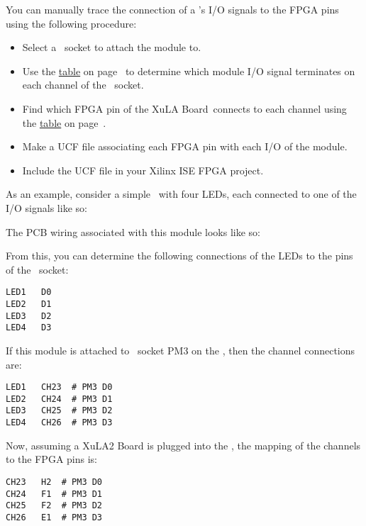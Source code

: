 \documentclass[letterpaper,11pt,oneside]{memoir}
\newcommand{\xula}{XuLA Board}
\renewcommand{\fixedpic}[1]{}
\begin{document}
You can manually trace the connection of a \digpmod's I/O signals to the
FPGA pins using the following procedure:

\begin{itemize}
\item Select a \digpmod\ socket to attach the module to.
\item Use the \hyperref[tab:ChanneltoPMODConnections]{table} on page~\pageref{tab:ChanneltoPMODConnections} to determine 
	which module I/O signal terminates on each channel of the \digpmod\ socket.
\item Find which FPGA pin of the \xula\ connects to each channel using the
	\hyperref[tab:ChanneltoFPGAConnections]{table} on page~\pageref{tab:ChanneltoFPGAConnections}.
\item Make a UCF file associating each FPGA pin with each I/O of the module.
\item Include the UCF file in your Xilinx ISE FPGA project.
\end{itemize}

\pagebreak %

As an example, consider a simple \digpmod\ with four LEDs, each
connected to one of the I/O signals like so:

\fixedpic{\texttt{[image: pmod\_example\_schematic.png]}}

The PCB wiring associated with this module looks like so:

\fixedpic{\texttt{[image: pmod\_example\_pcb.png]}}

From this, you can determine the following connections of the LEDs to the pins
of the \digpmod\ socket:

\begin{lstlisting}
LED1   D0
LED2   D1
LED3   D2
LED4   D3
\end{lstlisting}

If this module is attached to \digpmod\ socket PM3 on the \product, 
then the channel connections are:

\begin{lstlisting}
LED1   CH23  # PM3 D0
LED2   CH24  # PM3 D1
LED3   CH25  # PM3 D2
LED4   CH26  # PM3 D3
\end{lstlisting}

Now, assuming a XuLA2 Board is plugged into the \product, the mapping of
the channels to the FPGA pins is:

\begin{lstlisting}
CH23   H2  # PM3 D0
CH24   F1  # PM3 D1
CH25   F2  # PM3 D2
CH26   E1  # PM3 D3
\end{lstlisting}
\end{document}
